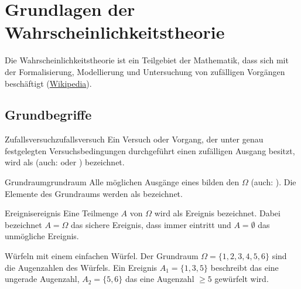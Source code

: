 \chapter{Grundlagen der Wahrscheinlichkeitstheorie}

Die Wahrscheinlichkeitstheorie ist ein Teilgebiet der Mathematik, dass sich mit
der Formalisierung, Modellierung und Untersuchung von zufälligen Vorgängen
beschäftigt (\href{https://de.wikipedia.org/wiki/Wahrscheinlichkeitstheorie}
{Wikipedia}).

\section{Grundbegriffe}

\begin{definition}{Zufallsversuch}{zufallsversuch}
Ein Versuch oder Vorgang, der unter genau festgelegten Versuchsbedingungen
durchgeführt einen zufälligen Ausgang besitzt, wird als 
(auch:  oder )
bezeichnet.
\end{definition}


\begin{definition}{Grundraum}{grundraum}
Alle möglichen Ausgänge eines 
bilden den  $\Omega$ (auch: ). Die
Elemente des Grundraums werden als  bezeichnet.
\end{definition}


\begin{definition}{Ereignis}{ereignis}
Eine Teilmenge $A$ von $\Omega$ wird als Ereignis bezeichnet. Dabei bezeichnet
$A = \Omega$ das sichere Ereignis, dass immer eintritt und $A = \emptyset$ das
unmögliche Ereignis.
\end{definition}

\begin{example}\label{bsp:ereignis}
Würfeln mit einem einfachen Würfel. Der Grundraum $\Omega = \{1,2,3,4,5,6\}$
sind die Augenzahlen des Würfels. Ein Ereignis $A_1 = \{1,3,5\}$ beschreibt das
eine ungerade Augenzahl, $A_2 = \{5,6\}$ das
eine Augenzahl $\ge 5$ gewürfelt wird.
\end{example}


